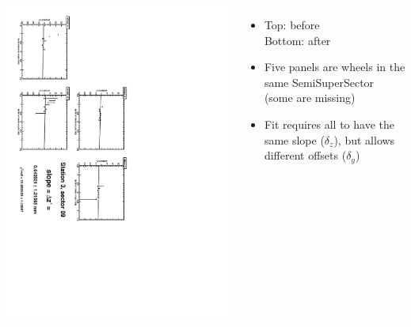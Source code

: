 \documentclass[compress]{beamer}
\begin{document}
\begin{frame}
\begin{columns}
\vfill
\includegraphics[height=\linewidth, angle=90]{zfits_after/zfit_3_09.pdf}
\begin{itemize}
\item Top: before \\ Bottom: after
\item Five panels are wheels in the same SemiSuperSector (some are missing)
\item Fit requires all to have the same slope ($\delta_z$), but allows different offsets ($\delta_y$)
\end{itemize}
\end{columns}
\end{frame}
\end{document}
